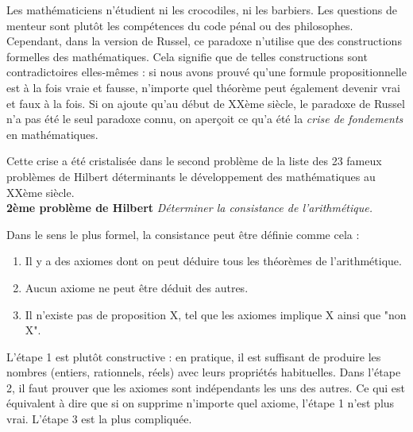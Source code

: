 \documentclass[12pt, a4paper]{article}
\newtheorem*{problem}{Problème}
\begin{document}
Les mathématiciens n'étudient ni les crocodiles, ni les barbiers.
Les questions de menteur sont plutôt les compétences du code pénal ou des philosophes.
Cependant, dans la version de Russel, ce paradoxe n'utilise que des constructions formelles des mathématiques. Cela signifie que de telles constructions sont contradictoires elles-mêmes : si nous avons prouvé qu'une formule propositionnelle est à la fois vraie et fausse, n'importe quel théorème peut également devenir vrai et faux à la fois.
Si on ajoute qu'au début de XXème siècle, le paradoxe de Russel n'a pas été le seul paradoxe connu, on aperçoit ce qu'a été la \emph{crise de fondements} en mathématiques.

Cette crise a été cristalisée dans le second problème de la liste des 23 fameux problèmes de Hilbert déterminants le développement des mathématiques au XXème siècle. \\
\textbf{2ème problème de Hilbert}
\textit{Déterminer la consistance de l'arithmétique.}

Dans le sens le plus formel, la consistance peut être définie comme cela :

\begin{enumerate}
	\item Il y a des axiomes dont on peut déduire tous les théorèmes de l'arithmétique.
	\item Aucun axiome ne peut être déduit des autres.
	\item Il n'existe pas de proposition X, tel que les axiomes implique X ainsi que "non X".
\end{enumerate}

L'étape 1 est plutôt constructive : en pratique, il est suffisant de produire les nombres (entiers, rationnels, réels) avec leurs propriétés habituelles.
Dans l'étape 2, il faut prouver que les axiomes sont indépendants les uns des autres.
Ce qui est équivalent à dire que si on supprime n'importe quel axiome, l'étape 1 n'est plus vrai.
L'étape 3 est la plus compliquée.
\end{document}
